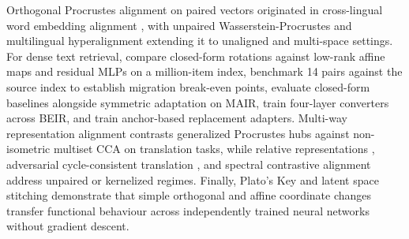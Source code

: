 \documentclass{article}
\begin{document}
Orthogonal Procrustes alignment on paired vectors originated in cross-lingual word embedding alignment \citep{conneau2018word,artetxe2018vecmap}, with unpaired Wasserstein-Procrustes \citep{grave2018wasserstein} and multilingual hyperalignment \citep{alaux2019umh} extending it to unaligned and multi-space settings. For dense text retrieval, \citet{vejendla2025drift} compare closed-form rotations against low-rank affine maps and residual MLPs on a million-item index, \citet{zhao2026bill} benchmark 14 pairs against the source index to establish migration break-even points, \citet{maekawa2026align} evaluate closed-form baselines alongside symmetric adaptation on MAIR, \citet{yoon2025converter} train four-layer converters across BEIR, and \citet{chivukula2026era} train anchor-based replacement adapters. Multi-way representation alignment \citep{achara2026multiway} contrasts generalized Procrustes hubs against non-isometric multiset CCA on translation tasks, while relative representations \citep{moschella2023relative}, adversarial cycle-consistent translation \citep{jha2025vec2vec}, and spectral contrastive alignment \citep{sui2026unicon} address unpaired or kernelized regimes. Finally, Plato's Key \citep{platoskey2026} and latent space stitching \citep{maiorca2023latent} demonstrate that simple orthogonal and affine coordinate changes transfer functional behaviour across independently trained neural networks without gradient descent.
\end{document}
